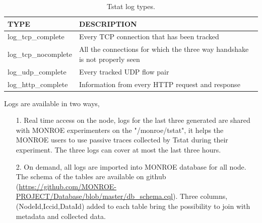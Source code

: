 \documentclass[a4paper,10pt]{article}
\begin{document}
\begin{table}[h]
	\caption{Tstat log types.}\label{tab:Tstatlogs}
	\begin{center}
	\begin{tabular}{ll}
		\toprule
		\textbf{TYPE} & \textbf{DESCRIPTION} \\
		\midrule
		log\_tcp\_complete & Every TCP connection that has been tracked \\
		log\_tcp\_nocomplete	& All the connections for which the three way handshake is not properly seen \\
		log\_udp\_complete & Every tracked UDP flow pair \\
		log\_http\_complete & Information from every HTTP request and response \\
			\bottomrule
	\end{tabular}
	\end{center}
\end{table}
    
Logs are available in two ways, 
\begin{itemize}
\item[1.] Real time access on the node, logs for the last three generated are shared with MONROE experimenters on the "/monroe/tstat", it helps the MONROE users to use passive traces collected by Tstat during their experiment. The three logs can cover at most the last three hours.
\item[2.] On demand, all logs are imported into MONROE database for all node. The schema of the tables are available on github (\url{https://github.com/MONROE-PROJECT/Database/blob/master/db_schema.cql}). Three columns, (NodeId,Iccid,DataId) added to each table bring the possibility to join with metadata and collected data. 
\end{itemize}
\end{document}
